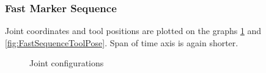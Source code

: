 \documentclass[]{scrartcl}
\begin{document}
\subsubsection*{Fast Marker Sequence}
Joint coordinates and tool positions are plotted on the graphs \ref{fig:FastSequenceJoints} and \ref{fig:FastSequenceToolPose}. Span of time axis is again shorter.

\begin{figure}[!htp]
	\hfill
	\caption{Joint configurations}
	\label{fig:FastSequenceJoints}
\end{figure}
\end{document}
